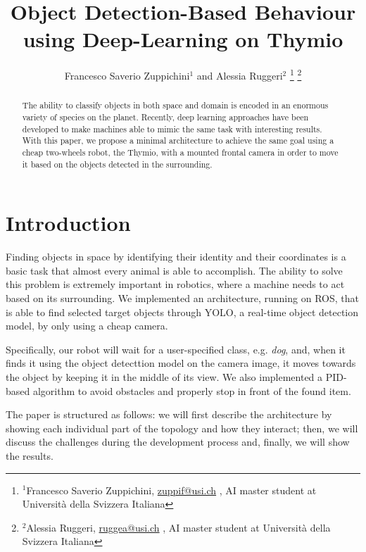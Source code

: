 \documentclass[letterpaper, 10 pt, conference]{ieeeconf}  %
\title{\LARGE \bf
Object Detection-Based Behaviour using Deep-Learning on Thymio
}
\author{Francesco Saverio Zuppichini$^{1}$ and Alessia Ruggeri$^{2}$%
\thanks{$^{1}$Francesco Saverio Zuppichini, \href{mailto:zuppif@usi.ch}{zuppif@usi.ch} , AI master student at Università della Svizzera Italiana }%
\thanks{$^{2}$Alessia Ruggeri, \href{mailto:ruggea@usi.ch}{ruggea@usi.ch} , AI master student at Università della Svizzera Italiana }%
}
\begin{document}
\maketitle
\thispagestyle{empty}
\pagestyle{empty}


\begin{abstract}
The ability to classify objects in both space and domain is encoded in an enormous variety of species on the planet. Recently, deep learning approaches have been developed to make machines able to mimic the same task with interesting results. With this paper, we propose a minimal architecture to achieve the same goal using a cheap two-wheels robot, the Thymio, with a mounted frontal camera in order to move it based on the objects detected in the surrounding. 
\end{abstract}

\section{Introduction}
Finding objects in space by identifying their identity and their coordinates is a basic task that almost every animal is able to accomplish. The ability to solve this problem is extremely important in robotics, where a machine needs to act based on its surrounding.  We implemented an architecture, running on ROS, that is able to find selected target objects through YOLO, a real-time object detection model,  by only using a cheap camera.

Specifically, our robot will wait for a user-specified class, e.g. \emph{dog}, and, when it finds it using the object detecttion model on the camera image, it moves towards the object by keeping it in the middle of its view. We also implemented a PID-based algorithm to avoid obstacles and properly stop in front of the found item.

The paper is structured as follows: we will first describe the architecture by showing each individual part of the topology and how they interact; then, we will discuss the challenges during the development process and, finally, we will show the results.
\end{document}
